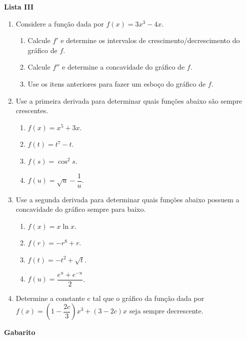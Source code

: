 \documentclass[12pt,a4paper]{article}
\begin{document}
\begin{center}
  \textbf{Lista III}
\end{center}

\begin{enumerate}
 \item Considere a função dada por $f(x) = 3x^3 - 4x$.
 
 \begin{enumerate}
   \item Calcule $f'$ e determine os intervalos de crescimento/decrescimento do gráfico de $f$.
   \item Calcule $f''$ e determine a concavidade do gráfico de $f$.
   \item Use os itens anteriores para fazer um esboço do gráfico de $f$.
 \end{enumerate}
 

 \item Use a primeira derivada para determinar quais funções abaixo são sempre crescentes.
 
 \begin{enumerate}
   \item $f(x) = x^5 + 3x$.
   \item $f(t) = t^7 - t$.
   \item $f(s) = \cos^2 s$.
   \item $f(u) = \sqrt{u} - \dfrac{1}{u}$.
 \end{enumerate}

 \item Use a segunda derivada para determinar quais funções abaixo possuem a concavidade do gráfico
 sempre para baixo.
 
 \begin{enumerate}
   \item $f(x) = x\ln x$.
   \item $f(r) = -r^8 + r$.
   \item $f(t) = -t^2 + \sqrt{t}$.
   \item $f(u) = \dfrac{e^u + e^{-u}}{2}$.
 \end{enumerate}
   
 \item Determine a constante c tal que o gráfico da função dada por $f(x) = \left(1 -\dfrac{2c}{3}\right)x^3 + (3 - 2c)x$ seja sempre decrescente.
 
\end{enumerate}

\newpage
\begin{center}
  \textbf{Gabarito}
\end{center}
\end{document}
